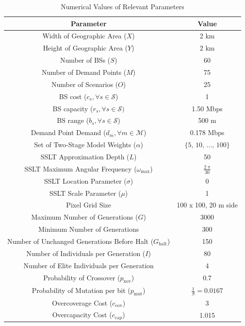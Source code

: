 \documentclass[onecolumn,draftcls]{IEEEtran}
\begin{document}
\begin{table} \centering
\caption{Numerical Values of Relevant Parameters}
\begin{tabular}{|c|c|} 
\hline
\textbf{Parameter} & \textbf{Value} \\
\hline
\hline 
Width of Geographic Area ($X$) & 2 km \\
\hline
Height of Geographic Area ($Y$) & 2 km \\
\hline
Number of BSs ($S$) & 60 \\ 
\hline 
Number of Demand Points ($M$) & 75 \\ 
\hline 
Number of Scenarios ($O$) & 25 \\ 
\hline 
BS cost ($c_s, \forall s \in \mathcal{S}$) & 1 \\ 
\hline 
BS capacity ($r_s, \forall s \in \mathcal{S})$ & 1.50 Mbps \\ 
\hline
BS range ($b_s, \forall s \in \mathcal{S}$) & 500 m \\
\hline 
Demand Point Demand ($d_m, \forall m \in \mathcal{M}$) & 0.178 Mbps \\ 
\hline 
Set of Two-Stage Model Weights ($\alpha$) & $\{5,\, 10,\, \ldots,\, 100\}$ \\ 
\hline 
\hline
SSLT Approximation Depth ($L$) & 50 \\ 
\hline
SSLT Maximum Angular Frequency ($\omega_{\max}$) & $\frac{2 \; \pi}{30}$ \\
\hline 
SSLT Location Parameter ($\sigma$) & 0 \\ 
\hline 
SSLT Scale Parameter ($\mu$) & 1 \\ 
\hline
Pixel Grid Size & 100 x 100, 20 m side\\
\hline 
\hline
Maximum Number of Generations ($G$) & 3000 \\ 
\hline
Minimum Number of Generations & 300 \\
\hline
Number of Unchanged Generations Before Halt ($G_\text{halt}$) & 150 \\
\hline 
Number of Individuals per Generation ($I$) & 80 \\ 
\hline
Number of Elite Individuals per Generation & 4 \\
\hline 
Probability of Crossover ($p_\text{xov}$) & 0.7 \\ 
\hline
Probability of Mutation per bit ($p_\text{mut}$) & $\frac{1}{S} = 0.0167$ \\
\hline 
Overcoverage Cost ($c_\text{cov}$) & 3 \\
\hline
Overcapacity Cost ($c_\text{cap}$) & 1.015 \\
\hline
\end{tabular}
\label{tab:simval}
\end{table}
\end{document}
